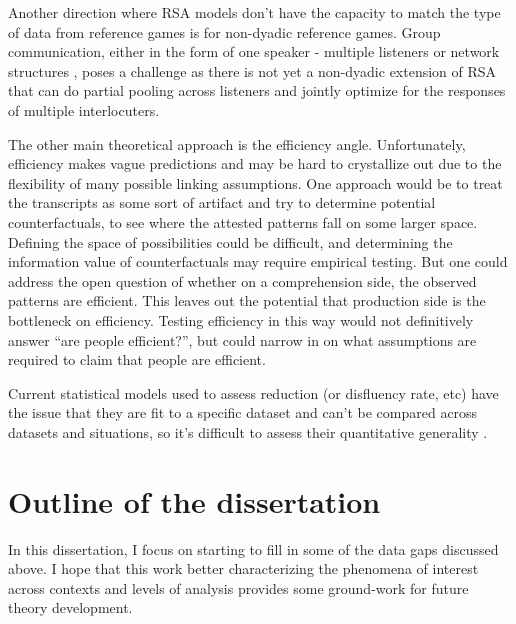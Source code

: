 \documentclass[]{article}
\begin{document}
	
	Another direction where RSA models don't have the capacity to match the type of data from reference games is for non-dyadic reference games. Group communication, either in the form of one speaker - multiple listeners \citep{yoon2014, yoon2018, yoon2019} or network structures \citep{hawkins2021a}, poses a challenge as there is not yet a non-dyadic extension of RSA that can do partial pooling across listeners and jointly optimize for the responses of multiple interlocuters. 
	
	The other main theoretical approach is the efficiency angle. Unfortunately, efficiency makes vague predictions and may be hard to crystallize out due to the flexibility of many possible linking assumptions. One approach would be to treat the transcripts as some sort of artifact and try to determine potential counterfactuals, to see where the attested patterns fall on some larger space. Defining the space of possibilities could be difficult, and determining the information value of counterfactuals may require empirical testing. But one could address the open question of whether on a comprehension side, the observed patterns are efficient. This leaves out the potential that production side is the bottleneck on efficiency. Testing efficiency in this way would not definitively answer ``are people efficient?'', but could narrow in on what assumptions are required to claim that people are efficient. 
		
		Current statistical models used to assess reduction (or disfluency rate, etc) have the issue that they are fit to a specific dataset and can't be compared across datasets and situations, so it's difficult to assess their quantitative generality \citep{yarkoni2017}. 
	
	\section{Outline of the dissertation}
	

	In this dissertation, I focus on starting to fill in some of the data gaps discussed above. I hope that this work better characterizing the phenomena of interest across contexts and levels of analysis provides some ground-work for future theory development. 
\end{document}
